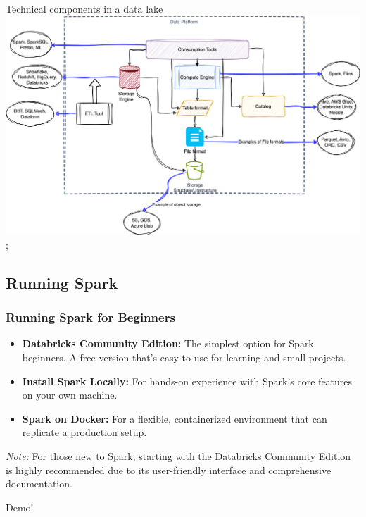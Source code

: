 \begin{frame}{Technical components in a data lake}
\includegraphics[width=\textwidth,height=.8\textheight,keepaspectratio]{./Figures/chapter-04/DataPlatform.png};
\end{frame}
\subsection{Running Spark}
\begin{frame}
\frametitle{Running Spark for Beginners}

\begin{itemize}
  \item \textbf{Databricks Community Edition:} The simplest option for Spark beginners. A free version that's easy to use for learning and small projects. \pause
  \item \textbf{Install Spark Locally:} For hands-on experience with Spark's core features on your own machine. \pause
  \item \textbf{Spark on Docker:} For a flexible, containerized environment that can replicate a production setup.
\end{itemize}

\bigskip %

\emph{Note:} For those new to Spark, starting with the Databricks Community Edition is highly recommended due to its user-friendly interface and comprehensive documentation.

\end{frame}
\begin{frame}
\centering %
\vfill %
\Large{Demo!} %
\vfill %
\end{frame}

